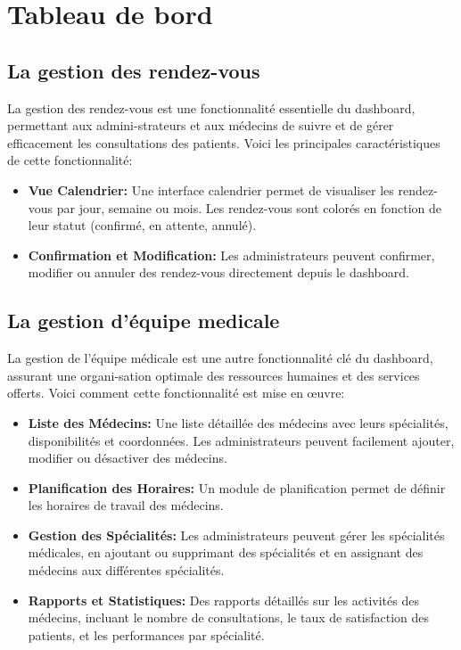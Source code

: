 \section{Tableau de bord}

\subsection{La gestion des rendez-vous}

\hspace {16pt}La gestion des rendez-vous est une fonctionnalité essentielle du dashboard, permettant aux admini-strateurs et aux médecins de suivre et de gérer efficacement les consultations des patients. Voici les principales caractéristiques de cette fonctionnalité:

\begin{itemize}
  \item \textbf{Vue Calendrier: }Une interface calendrier permet de visualiser les rendez-vous par jour, semaine ou mois. Les rendez-vous sont colorés en fonction de leur statut (confirmé, en attente, annulé).
  \item \textbf{Confirmation et Modification: }Les administrateurs peuvent confirmer, modifier ou annuler des rendez-vous directement depuis le dashboard.
\end{itemize}

\subsection{La gestion d'équipe medicale}

\hspace{16pt} La gestion de l’équipe médicale est une autre fonctionnalité clé du dashboard, assurant une organi-sation optimale des ressources humaines et des services offerts. Voici comment cette fonctionnalité est mise en œuvre:

\begin{itemize}
  \item \textbf{Liste des Médecins: }Une liste détaillée des médecins avec leurs spécialités, disponibilités et coordonnées. Les administrateurs peuvent facilement ajouter, modifier ou désactiver des médecins.
  \item \textbf{Planification des Horaires: }Un module de planification permet de définir les horaires de travail des médecins.
  \item \textbf{Gestion des Spécialités: }Les administrateurs peuvent gérer les spécialités médicales, en ajoutant ou supprimant des spécialités et en assignant des médecins aux différentes spécialités.
  \item \textbf{Rapports et Statistiques: }Des rapports détaillés sur les activités des médecins, incluant le nombre de consultations, le taux de satisfaction des patients, et les performances par spécialité.
\end{itemize}

